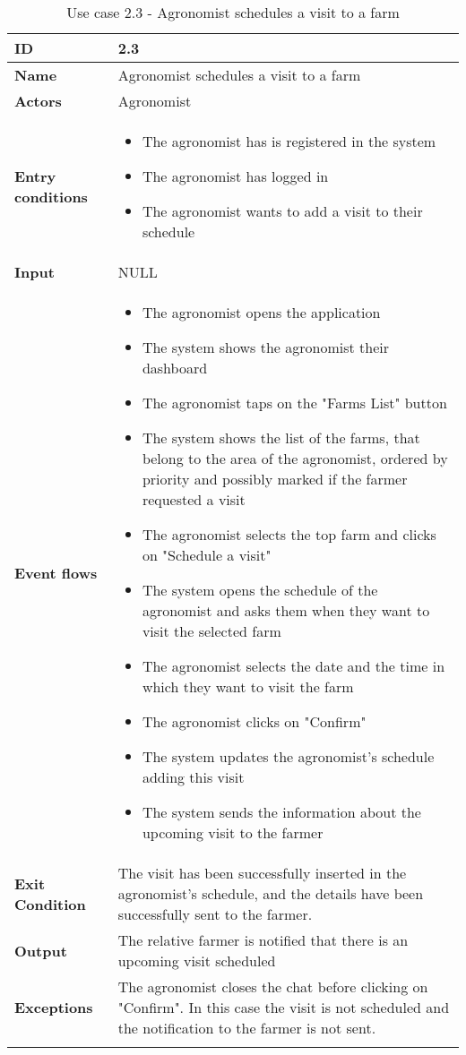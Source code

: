 \begin{longtable}[H]{ | l | p{10cm} | }
\hline
{\cellcolor[rgb]{0.753,0.753,0.753}}\textbf{ID}  & 2.3 \\ \hline
{\cellcolor[rgb]{0.753,0.753,0.753}}\textbf{Name} & Agronomist schedules a visit to a farm\\ \hline
{\cellcolor[rgb]{0.753,0.753,0.753}}\textbf{Actors} & Agronomist \\ \hline
{\cellcolor[rgb]{0.753,0.753,0.753}}\textbf{Entry conditions} &
\begin{itemize}
    \item The agronomist has is registered in the system
    \item The agronomist has logged in
    \item The agronomist wants to add a visit to their schedule
\end{itemize}
\\ \hline
{\cellcolor[rgb]{0.753,0.753,0.753}}\textbf{Input} & NULL \\ \hline
{\cellcolor[rgb]{0.753,0.753,0.753}}\textbf{Event flows} &
\begin{itemize}
    \item The agronomist opens the application
    \item The system shows the agronomist their dashboard
    \item The agronomist taps on the "Farms List" button
    \item The system shows the list of the farms, that belong to the area of the agronomist, ordered by priority and possibly marked if the farmer requested a visit
    \item The agronomist selects the top farm and clicks on "Schedule a visit"
    \item The system opens the schedule of the agronomist and asks them when they want to visit the selected farm
    \item The agronomist selects the date and the time in which they want to visit the farm
    \item The agronomist clicks on "Confirm"
    \item The system updates the agronomist’s schedule adding this visit
    \item The system sends the information about the upcoming visit to the farmer
\end{itemize}
\\ \hline
{\cellcolor[rgb]{0.753,0.753,0.753}}\textbf{Exit Condition} & The visit has been successfully inserted in the agronomist’s schedule, and the details have been successfully sent to the farmer.\\ \hline
{\cellcolor[rgb]{0.753,0.753,0.753}}\textbf{Output} & The relative farmer is notified that there is an upcoming visit scheduled\\ \hline
{\cellcolor[rgb]{0.753,0.753,0.753}}\textbf{Exceptions} &
The agronomist closes the chat before clicking on "Confirm". In this case the visit is not scheduled and the notification to the farmer is not sent.
\\ \hline
\caption{Use case 2.3 - Agronomist schedules a visit to a farm}
\\
\end{longtable}